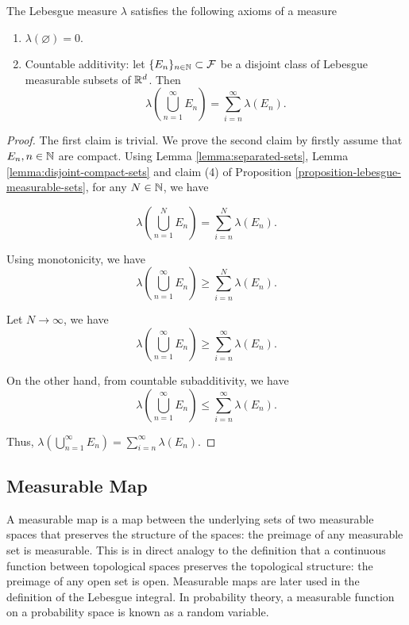 \begin{theorem}
  The Lebesgue measure $\lambda$ satisfies the following axioms of a measure

  \begin{enumerate}[label=(\arabic*)]
    \item $\lambda(\varnothing) = 0$.
    \item Countable additivity: let $\{E_n\}_{n\in \mathbb{N}}\subset\mathcal{F}$ be a disjoint class of Lebesgue measurable subsets of $\mathbb{R}^d$. Then
          \begin{equation}
            \lambda\left(\bigcup\limits_{n=1}^\infty E_n\right)=\sum\limits_{i=n}^\infty \lambda(E_n).
          \end{equation}
  \end{enumerate}
\end{theorem}

\begin{proof}
  The first claim is trivial. We prove the second claim by firstly assume that $E_n, n\in\mathbb{N}$ are compact. Using Lemma \ref{lemma:separated-sets}, Lemma \ref{lemma:disjoint-compact-sets} and claim (4) of Proposition \ref{proposition-lebesgue-measurable-sets}, for any $N\in\mathbb{N}$, we have

  $$\lambda\left(\bigcup\limits_{n=1}^N E_n\right)=\sum\limits_{i=n}^N \lambda(E_n).$$

  Using monotonicity, we have
  $$\lambda\left(\bigcup\limits_{n=1}^\infty E_n\right)\ge\sum\limits_{i=n}^N \lambda(E_n).$$

  Let $N\to\infty$, we have
  $$\lambda\left(\bigcup\limits_{n=1}^\infty E_n\right)\ge\sum\limits_{i=n}^\infty \lambda(E_n).$$

  On the other hand, from countable subadditivity, we have
  $$\lambda\left(\bigcup\limits_{n=1}^\infty E_n\right)\le\sum\limits_{i=n}^\infty \lambda(E_n).$$

  Thus, $\lambda\left(\bigcup\limits_{n=1}^\infty E_n\right)=\sum\limits_{i=n}^\infty \lambda(E_n).$

\end{proof}

\subsection{Measurable Map}

A measurable map is a map between the underlying sets of two measurable spaces that preserves the structure of the spaces: the preimage of any measurable set is measurable. This is in direct analogy to the definition that a continuous function between topological spaces preserves the topological structure: the preimage of any open set is open. Measurable maps are later used in the definition of the Lebesgue integral. In probability theory, a measurable function on a probability space is known as a random variable.

